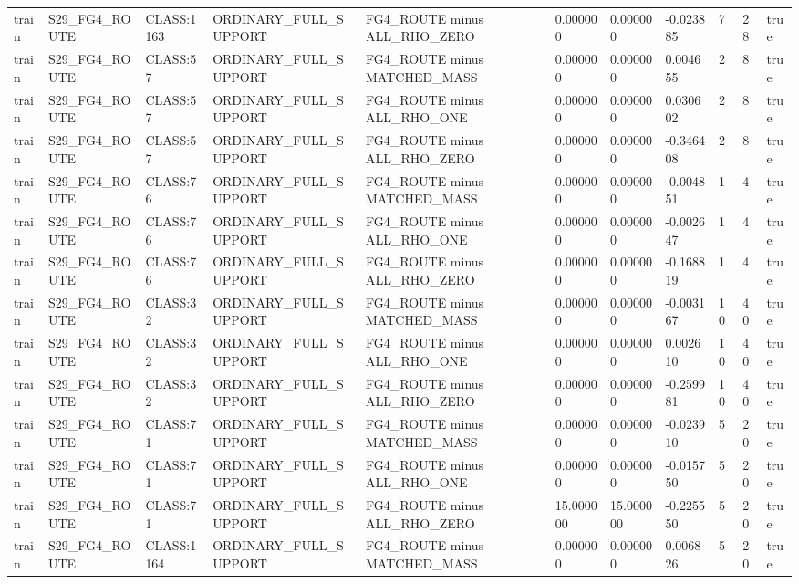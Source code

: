 \begin{tabular}{lllllllllll}
train & S29\_FG4\_ROUTE & CLASS:1163 & ORDINARY\_FULL\_SUPPORT & FG4\_ROUTE minus ALL\_RHO\_ZERO & 0.000000 & 0.000000 & -0.023885 & 7 & 28 & true \\
train & S29\_FG4\_ROUTE & CLASS:57 & ORDINARY\_FULL\_SUPPORT & FG4\_ROUTE minus MATCHED\_MASS & 0.000000 & 0.000000 & 0.004655 & 2 & 8 & true \\
train & S29\_FG4\_ROUTE & CLASS:57 & ORDINARY\_FULL\_SUPPORT & FG4\_ROUTE minus ALL\_RHO\_ONE & 0.000000 & 0.000000 & 0.030602 & 2 & 8 & true \\
train & S29\_FG4\_ROUTE & CLASS:57 & ORDINARY\_FULL\_SUPPORT & FG4\_ROUTE minus ALL\_RHO\_ZERO & 0.000000 & 0.000000 & -0.346408 & 2 & 8 & true \\
train & S29\_FG4\_ROUTE & CLASS:76 & ORDINARY\_FULL\_SUPPORT & FG4\_ROUTE minus MATCHED\_MASS & 0.000000 & 0.000000 & -0.004851 & 1 & 4 & true \\
train & S29\_FG4\_ROUTE & CLASS:76 & ORDINARY\_FULL\_SUPPORT & FG4\_ROUTE minus ALL\_RHO\_ONE & 0.000000 & 0.000000 & -0.002647 & 1 & 4 & true \\
train & S29\_FG4\_ROUTE & CLASS:76 & ORDINARY\_FULL\_SUPPORT & FG4\_ROUTE minus ALL\_RHO\_ZERO & 0.000000 & 0.000000 & -0.168819 & 1 & 4 & true \\
train & S29\_FG4\_ROUTE & CLASS:32 & ORDINARY\_FULL\_SUPPORT & FG4\_ROUTE minus MATCHED\_MASS & 0.000000 & 0.000000 & -0.003167 & 10 & 40 & true \\
train & S29\_FG4\_ROUTE & CLASS:32 & ORDINARY\_FULL\_SUPPORT & FG4\_ROUTE minus ALL\_RHO\_ONE & 0.000000 & 0.000000 & 0.002610 & 10 & 40 & true \\
train & S29\_FG4\_ROUTE & CLASS:32 & ORDINARY\_FULL\_SUPPORT & FG4\_ROUTE minus ALL\_RHO\_ZERO & 0.000000 & 0.000000 & -0.259981 & 10 & 40 & true \\
train & S29\_FG4\_ROUTE & CLASS:71 & ORDINARY\_FULL\_SUPPORT & FG4\_ROUTE minus MATCHED\_MASS & 0.000000 & 0.000000 & -0.023910 & 5 & 20 & true \\
train & S29\_FG4\_ROUTE & CLASS:71 & ORDINARY\_FULL\_SUPPORT & FG4\_ROUTE minus ALL\_RHO\_ONE & 0.000000 & 0.000000 & -0.015750 & 5 & 20 & true \\
train & S29\_FG4\_ROUTE & CLASS:71 & ORDINARY\_FULL\_SUPPORT & FG4\_ROUTE minus ALL\_RHO\_ZERO & 15.000000 & 15.000000 & -0.225550 & 5 & 20 & true \\
train & S29\_FG4\_ROUTE & CLASS:1164 & ORDINARY\_FULL\_SUPPORT & FG4\_ROUTE minus MATCHED\_MASS & 0.000000 & 0.000000 & 0.006826 & 5 & 20 & true \\

\end{tabular}
